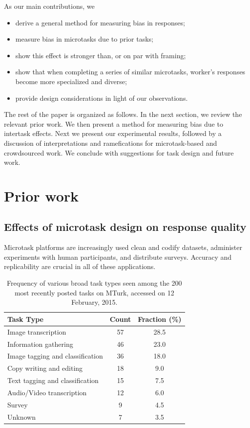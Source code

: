 \documentclass{sigchi}
\begin{document}
As our main contributions, we
\begin{itemize}[noitemsep,nolistsep]
  \item{derive a general method for measuring bias in responses;}
  \item{measure bias in microtasks due to prior tasks;}
  \item{show this effect is stronger than, or on par with framing;}
  \item{
	show that when completing a series of similar microtasks,
	worker's responses become more specialized and diverse;
  }
  \item{provide design considerations in light of our observations.}
\end{itemize}

The rest of the paper is organized as follows.  In the next section, we 
review the relevant prior work.  We then present a method for 
measuring bias due to intertask effects.  
Next we present our experimental results, followed by a discussion 
of interpretations and ramefications for microtask-based and crowdsourced 
work.  We conclude with suggestions for task design and future work.

\section{Prior work}
\subsection{Effects of microtask design on response quality}
Microtask platforms are increasingly used clean and codify datasets,
administer experiments with human participants, and distribute 
surveys.  Accuracy and replicability are crucial in all of these 
applications.

\begin{table}
\centering
\begin{tabular}{l c c}
\toprule
Task Type & Count & Fraction (\%) \\
\toprule
Image transcription & 57 & 28.5 \\
Information gathering & 46 & 23.0 \\
Image tagging and classification & 36 & 18.0 \\
Copy writing and editing & 18 & 9.0 \\
Text tagging and classification & 15 & 7.5 \\
Audio/Video transcription & 12 & 6.0 \\
Survey & 9 & 4.5 \\
Unknown & 7 & 3.5 \\
\bottomrule
\end{tabular}
\caption{
	Frequency of various broad task types seen among the 200 most 
	recently posted tasks on MTurk, accessed on 12 February, 2015.
}
\label{table:task_composition}
\end{table}
\end{document}
